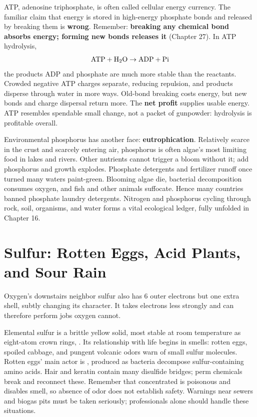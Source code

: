 ATP, adenosine triphosphate, is often called cellular energy currency. The familiar claim that energy is stored in high-energy phosphate bonds and released by breaking them is \textbf{wrong}. Remember: \textbf{breaking any chemical bond absorbs energy; forming new bonds releases it} (Chapter 27). In ATP hydrolysis,
\[\mathrm{ATP} + \mathrm{H_2O} \rightarrow \mathrm{ADP} + \mathrm{Pi}\]
the products ADP and phosphate are much more stable than the reactants. Crowded negative ATP charges separate, reducing repulsion, and products disperse through water in more ways. Old-bond breaking costs energy, but new bonds and charge dispersal return more. The \textbf{net profit} supplies usable energy. ATP resembles spendable small change, not a packet of gunpowder: hydrolysis is profitable overall.

Environmental phosphorus has another face: \textbf{eutrophication}. Relatively scarce in the crust and scarcely entering air, phosphorus is often algae's most limiting food in lakes and rivers. Other nutrients cannot trigger a bloom without it; add phosphorus and growth explodes. Phosphate detergents and fertilizer runoff once turned many waters paint-green. Blooming algae die, bacterial decomposition consumes oxygen, and fish and other animals suffocate. Hence many countries banned phosphate laundry detergents. Nitrogen and phosphorus cycling through rock, soil, organisms, and water forms a vital ecological ledger, fully unfolded in Chapter 16.

\section{Sulfur: Rotten Eggs, Acid Plants, and Sour Rain}

Oxygen's downstairs neighbor sulfur also has 6 outer electrons but one extra shell, subtly changing its character. It takes electrons less strongly and can therefore perform jobs oxygen cannot.

Elemental sulfur is a brittle yellow solid, most stable at room temperature as eight-atom crown rings, . Its relationship with life begins in smells: rotten eggs, spoiled cabbage, and pungent volcanic odors warn of small sulfur molecules. Rotten eggs' main actor is , produced as bacteria decompose sulfur-containing amino acids. Hair and keratin contain many disulfide bridges; perm chemicals break and reconnect these. Remember that concentrated  is poisonous and disables smell, so absence of odor does not establish safety. Warnings near sewers and biogas pits must be taken seriously; professionals alone should handle these situations.

